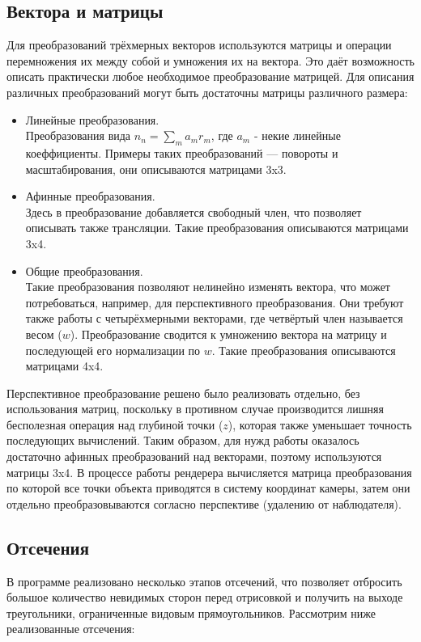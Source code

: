 \documentclass[a4paper,12pt]{report}
\begin{document}
\subsection{Вектора и матрицы}
Для преобразований трёхмерных векторов используются матрицы и операции перемножения их между собой и умножения их на вектора. Это даёт возможность описать практически любое необходимое преобразование матрицей. Для описания различных преобразований могут быть достаточны матрицы различного размера:
\begin{itemize}
\item Линейные преобразования. \\
Преобразования вида $n_n = \sum_m a_m r_m$, где $a_m$ - некие линейные коеффициенты. Примеры таких преобразований --- повороты и масштабирования, они описываются матрицами 3x3.
\item Афинные преобразования. \\
Здесь в преобразование добавляется свободный член, что позволяет описывать также трансляции. Такие преобразования описываются матрицами 3x4.
\item Общие преобразования. \\
Такие преобразования позволяют нелинейно изменять вектора, что может потребоваться, например, для перспективного преобразования. Они требуют также работы с четырёхмерными векторами, где четвёртый член называется весом ($w$). Преобразование сводится к умножению вектора на матрицу и последующей его нормализации по $w$. Такие преобразования описываются матрицами 4x4.
\end{itemize}
Перспективное преобразование решено было реализовать отдельно, без использования матриц, поскольку в противном случае производится лишняя бесполезная операция над глубиной точки ($z$), которая также уменьшает точность последующих вычислений. Таким образом, для нужд работы оказалось достаточно афинных преобразований над векторами, поэтому используются матрицы 3x4. В процессе работы рендерера вычисляется матрица преобразования по которой все точки объекта приводятся в систему координат камеры, затем они отдельно преобразовываются согласно перспективе (удалению от наблюдателя).

\subsection{Отсечения}
В программе реализовано несколько этапов отсечений, что позволяет отбросить большое количество невидимых сторон перед отрисовкой и получить на выходе треугольники, ограниченные видовым прямоугольников. Рассмотрим ниже реализованные отсечения:
\end{document}
